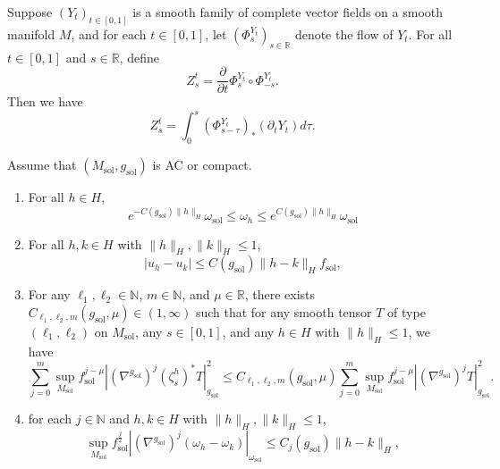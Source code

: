 \documentclass[10pt,a4paper]{amsart}
\newcommand{\N}{\mathbb{N}}
\newcommand{\R}{\mathbb{R}}
\providecommand{\sol}{\operatorname{sol}}
\begin{document}
\begin{lemma}\label{tech lemma on lie derivative}
    Suppose $(Y_t)_{t\in [0,1]}$ is a smooth family of complete vector fields on a smooth manifold $M$, and for each $t\in [0,1]$, let $(\Phi_s^{Y_t})_{s\in\R}$ denote the flow of $Y_t$. For all $t\in [0,1]$ and $s\in \mathbb{R}$, define
    \begin{equation*}
        Z_s^t=\frac{\partial}{\partial t}\Phi_s^{Y_t}\circ \Phi_{-s}^{Y_t}.
    \end{equation*}
    Then we have
    \begin{equation*}
        Z_s^t=\int_0^s(\Phi_{s-\tau}^{Y_t})_{\ast}(\partial_t Y_t) d\tau.
    \end{equation*}
\end{lemma}

\begin{prop} \label{prop:modelmetrics} Assume that $(M_{\sol},g_{\sol})$ is AC or compact.

\begin{enumerate}

    \item \label{modelmetrics0} For all $h\in H$, 
\begin{equation*} 
   e^{-C(g_{\sol})\|h\|_H} \omega_{\sol} \leq  \omega_h \leq e^{C(g_{\sol})\|h\|_H}\omega_{\sol}
\end{equation*}

\item \label{modelmetrics1} For all $h,k\in H$ with $\|h\|_H,\|k\|_H \leq 1$, 
    \begin{equation*} |u_h-u_k|\le C(g_{\sol})\|h-k\|_H f_{\sol},\end{equation*}

\item \label{modelmetrics2.5} For any $\ell_1,\ell_2 \in \mathbb{N}$, $m\in \mathbb{N}$, and $\mu \in \mathbb{R}$, there exists $C_{\ell_1,\ell_2,m}(g_{\sol},\mu) \in (1,\infty)$ such that for any smooth tensor $T$ of type $(\ell_1,\ell_2)$ on $M_{\sol}$, any $s\in [0,1]$, and any $h\in H$ with $\|h\|_H \leq 1$, we have 
\begin{equation*}
    \sum_{j=0}^m \sup_{M_{\sol}} f_{\sol}^{j-\mu}|(\nabla^{g_{\sol}})^j (\zeta_s^h)^{\ast}T|_{g_{\sol}}^2 \leq C_{\ell_1,\ell_2,m}(g_{\sol},\mu)\sum_{j=0}^{m} \sup_{M_{\sol}} f_{\sol}^{j-\mu}|(\nabla^{g_{\sol}})^jT|_{g_{\sol}}^2.
\end{equation*}

\item \label{modelmetrics3} 
for each $j\in\N$ and $h,k\in H$ with $\|h\|_H,\|k\|_H \leq 1$, 
\begin{equation*}
    \sup_{M_{\sol}}f_{\sol}^{\frac{j}{2}}|(\nabla^{g_{\sol}})^j(\omega_{h}-\omega_{k})|_{\omega_{\sol}}\leq C_j(g_{\sol})\|h-k\|_{H},
\end{equation*}


\end{enumerate}
\end{prop}
\end{document}
